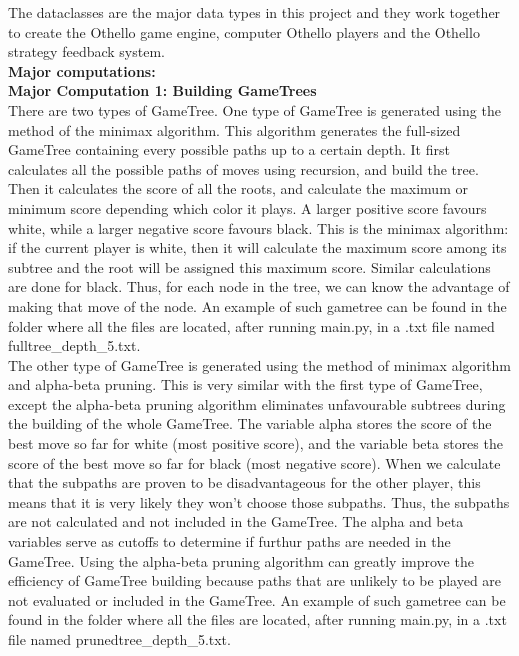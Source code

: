 \documentclass[fontsize=11pt]{article}
\begin{document}
The dataclasses are the major data types in this project and they work together to create the Othello game engine, computer Othello players and the Othello strategy feedback system.\\

\textbf{Major computations:} \\

\textbf{Major Computation 1: Building GameTrees}\\

There are two types of GameTree. One type of GameTree is generated using the method of the minimax algorithm. This algorithm generates the full-sized GameTree containing every possible paths up to a certain depth. It first calculates all the possible paths of moves using recursion, and build the tree. Then it calculates the score of all the roots, and calculate the maximum or minimum score depending which color it plays. A larger positive score favours white, while a larger negative score favours black. This is the minimax algorithm: if the current player is white, then it will calculate the maximum score among its subtree and the root will be assigned this maximum score. Similar calculations are done for black. Thus, for each node in the tree, we can know the advantage of making that move of the node. An example of such gametree can be found in the folder where all the files are located, after running main.py, in a .txt file named fulltree\_depth\_5.txt.\\

The other type of GameTree is generated using the method of minimax algorithm and alpha-beta pruning. This is very similar with the first type of GameTree, except the alpha-beta pruning algorithm eliminates unfavourable subtrees during the building of the whole GameTree. The variable alpha stores the score of the best move so far for white (most positive score), and the variable beta stores the score of the best move so far for black (most negative score). When we calculate that the subpaths are proven to be disadvantageous for the other player, this means that it is very likely they won't choose those subpaths. Thus, the subpaths are not calculated and not included in the GameTree. The alpha and beta variables serve as cutoffs to determine if furthur paths are needed in the GameTree. Using the alpha-beta pruning algorithm can greatly improve the efficiency of GameTree building because paths that are unlikely to be played are not evaluated or included in the GameTree. An example of such gametree can be found in the folder where all the files are located, after running main.py, in a .txt file named prunedtree\_depth\_5.txt.\\
\end{document}
